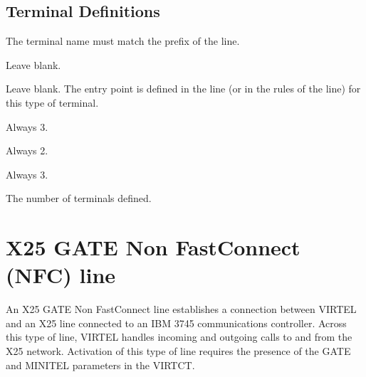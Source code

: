 \documentclass[letterpaper,10pt,english]{sphinxmanual}
\begin{document}
\subsection{Terminal Definitions}
\label{\detokenize{connectivity_guide:index-60}}\label{\detokenize{connectivity_guide:id27}}\begin{description}
\sphinxAtStartPar
The terminal name must match the prefix of the line.

\sphinxAtStartPar
Leave blank.

\sphinxAtStartPar
Leave blank. The entry point is defined in the line (or in the rules of the line) for this type of terminal.

\sphinxAtStartPar
Always 3.

\sphinxAtStartPar
Always 2.

\sphinxAtStartPar
Always 3.

\sphinxAtStartPar
The number of terminals defined.

\end{description}

\newpage

\ignorespaces 

\section{X25 GATE Non Fast\sphinxhyphen{}Connect (NFC) line}
\label{\detokenize{connectivity_guide:x25-gate-non-fast-connect-nfc-line}}\label{\detokenize{connectivity_guide:v462cn-x25gateline}}\label{\detokenize{connectivity_guide:index-61}}
\sphinxAtStartPar
An X25 GATE Non Fast\sphinxhyphen{}Connect line establishes a connection between VIRTEL and an X25 line connected to an IBM 3745 communications controller. Across this type of line, VIRTEL handles incoming and outgoing calls to and from the X25 network. Activation of this type of line requires the presence of the GATE and MINITEL parameters in the VIRTCT.

\sphinxAtStartPar
{}
\end{document}
